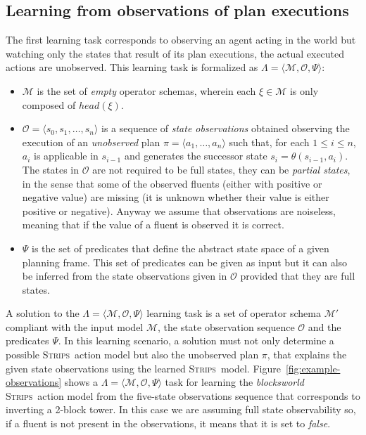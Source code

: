 \documentclass[3p,times]{elsarticle}
\newcommand{\strips}{\textsc{Strips}}     %
\newcommand{\tup}[1]{{\langle #1 \rangle}}
\begin{document}
\subsection{Learning from observations of plan executions}
The first learning task corresponds to observing an agent acting in the world but watching only the states that result of its plan executions, the actual executed actions are unobserved. This learning task is formalized as $\Lambda=\tup{\mathcal{M},\mathcal{O},\Psi}$:
\begin{itemize}
\item $\mathcal{M}$ is the set of {\em empty} operator schemas, wherein each $\xi\in\mathcal{M}$ is only composed of $head(\xi)$. 
\item $\mathcal{O}=\tup{s_0,s_1,\ldots,s_{n}}$ is a sequence of {\em state observations} obtained observing the execution of an {\em unobserved} plan $\pi=\tup{a_1, \ldots, a_n}$ such that, for each {\small $1\leq i\leq n$}, $a_i$ is applicable in $s_{i-1}$ and generates the successor state $s_i=\theta(s_{i-1},a_i)$. The states in $\mathcal{O}$ are not required to be full states, they can be {\em partial states}, in the sense that some of the observed fluents (either with positive or negative value) are missing (it is unknown whether their value is either positive or negative). Anyway we assume that observations are noiseless, meaning that if the value of a fluent is observed it is correct.
\item $\Psi$ is the set of predicates that define the abstract state space of a given planning frame. This set of predicates can be given as input but it can also be inferred from the state observations given in $\mathcal{O}$ provided that they are full states.
\end{itemize}

A solution to the $\Lambda=\tup{\mathcal{M},\mathcal{O},\Psi}$ learning task is a set of operator schema $\mathcal{M}'$ compliant with the input model $\mathcal{M}$, the state observation sequence $\mathcal{O}$ and the predicates $\Psi$. In this learning scenario, a solution must not only determine a possible \strips\ action model but also the unobserved plan $\pi$, that explains the given state observations using the learned \strips\ model. Figure~\ref{fig:example-observations} shows a $\Lambda=\tup{\mathcal{M},\mathcal{O},\Psi}$ task for learning the {\em blocksworld} \strips\ action model from the five-state observations sequence that corresponds to inverting a 2-block tower. In this case we are assuming full state observability so, if a fluent is not present in the observations, it means that it is set to {\em false}.
\end{document}
